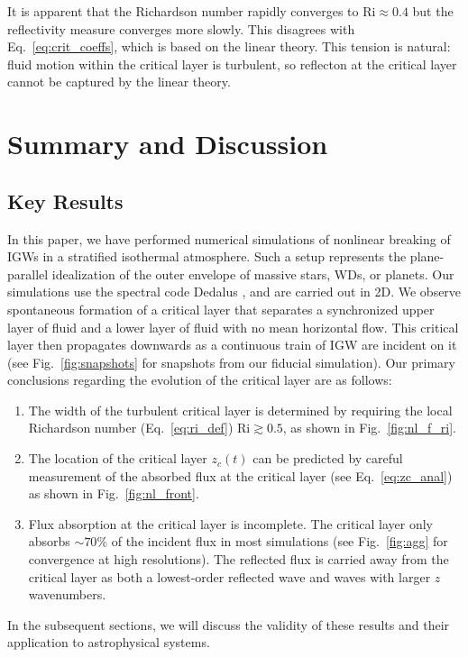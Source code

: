\documentclass[
        fleqn,
        usenatbib,
        referee,
    ]{mnras}
\begin{document}
It is apparent that the Richardson number rapidly converges to $\mathrm{Ri}
\approx 0.4$ but the reflectivity measure converges more slowly. This disagrees
with Eq.~\eqref{eq:crit_coeffs}, which is based on the linear theory. This
tension is natural: fluid motion within the critical layer is turbulent, so
reflecton at the critical layer cannot be captured by the linear theory.

\section{Summary and Discussion}\label{s:discussion}

\subsection{Key Results}

In this paper, we have performed numerical simulations of nonlinear breaking of
IGWs in a stratified isothermal atmosphere. Such a setup represents the
plane-parallel idealization of the outer envelope of massive stars, WDs, or
planets. Our simulations use the spectral code Dedalus \citep{dedalus,dedalus2},
and are carried out in 2D. We observe spontaneous formation of a critical layer
that separates a synchronized upper layer of fluid and a lower layer of fluid
with no mean horizontal flow. This critical layer then propagates downwards as a
continuous train of IGW are incident on it (see Fig.~\ref{fig:snapshots} for
snapshots from our fiducial simulation). Our primary conclusions regarding the
evolution of the critical layer are as
follows:
\begin{enumerate}
    \item The width of the turbulent critical layer is determined by requiring
        the local Richardson number (Eq.~\eqref{eq:ri_def}) $\mathrm{Ri} \gtrsim
        0.5$, as shown in Fig.~\ref{fig:nl_f_ri}.

    \item The location of the critical layer $z_c(t)$ can be predicted by
        careful measurement of the absorbed flux at the critical layer
        (see Eq.~\eqref{eq:zc_anal}) as shown in Fig.~\ref{fig:nl_front}.

    \item Flux absorption at the critical layer is incomplete. The
        critical layer only absorbs $\sim 70\%$ of the incident flux in most
        simulations (see Fig.~\ref{fig:agg} for convergence at high
        resolutions). The reflected flux is carried away from the critical layer
        as both a lowest-order reflected wave and waves with larger $z$
        wavenumbers.
\end{enumerate}
In the subsequent sections, we will discuss the validity of these results and
their application to astrophysical systems.
\end{document}
